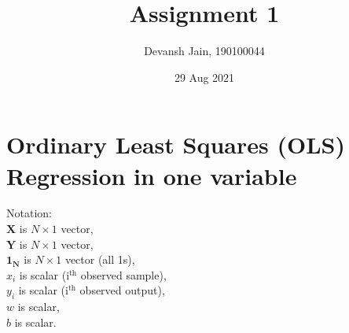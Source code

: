 \documentclass[12pt, fleqn]{article}
\title{Assignment 1}
\author{Devansh Jain, 190100044}
\date{29 Aug 2021}
\begin{document}
\maketitle
\tableofcontents
\thispagestyle{empty}
\setcounter{page}{0}

\newpage
\section{Ordinary Least Squares (OLS) Regression in one variable}
Notation: \\
$\mathbf{X}$ is $N \times 1$ vector, \\
$\mathbf{Y}$ is $N \times 1$ vector, \\
$\mathbf{1_N}$ is $N \times 1$ vector (all 1s), \\
$x_i$ is scalar (i$^\text{th}$ observed sample), \\
$y_i$ is scalar (i$^\text{th}$ observed output), \\
$w$ is scalar, \\
$b$ is scalar.
\end{document}

